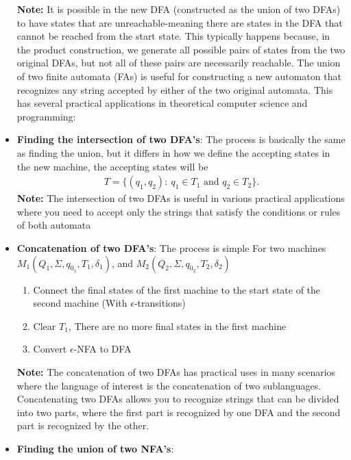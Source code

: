 \documentclass{report}
\begin{document}
\begin{itemize}
        \bigbreak \noindent 
        \textbf{Note:} It is possible in the new DFA (constructed as the union of two DFAs) to have states that are unreachable-meaning there are states in the DFA that cannot be reached from the start state. This typically happens because, in the product construction, we generate all possible pairs of states from the two original DFAs, but not all of these pairs are necessarily reachable.
        \bigbreak \noindent 
        The union of two finite automata (FAs) is useful for constructing a new automaton that recognizes any string accepted by either of the two original automata. This has several practical applications in theoretical computer science and programming:
    \item \textbf{Finding the intersection of two DFA's}: The process is basically the same as finding the union, but it differs in how we define the accepting states in the new machine, the accepting states will be
        \begin{align*}
            T = \{(q_{1},q_{2}):\ q_{1} \in T_{1} \text{ and } q_{2} \in T_{2}\}
        .\end{align*}
        \bigbreak \noindent 
        \textbf{Note:} The intersection of two DFAs is useful in various practical applications where you need to accept only the strings that satisfy the conditions or rules of both automata
    \item \textbf{Concatenation of two DFA's}: The process is simple
        \bigbreak \noindent 
        For two machines $M_{1}(Q_{1}, \Sigma, q_{0_{1}}, T_{1}, \delta_{1})$, and $M_{2}(Q_{2}, \Sigma, q_{0_{2}}, T_{2}, \delta_{2})$ 
        \begin{enumerate}
            \item Connect the final states of the first machine to the start state of the second machine (With $\epsilon$-transitions)
            \item Clear $T_{1}$, There are no more final states in the first machine
            \item Convert $\epsilon$-NFA to DFA
        \end{enumerate}
        \textbf{Note:} The concatenation of two DFAs has practical uses in many scenarios where the language of interest is the concatenation of two sublanguages. Concatenating two DFAs allows you to recognize strings that can be divided into two parts, where the first part is recognized by one DFA and the second part is recognized by the other.
    \item \textbf{Finding the union of two NFA's}:

\end{itemize}
\end{document}
